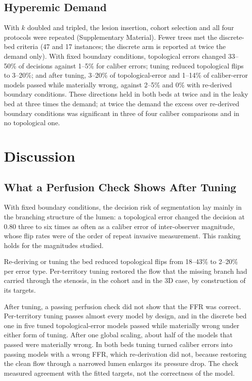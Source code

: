 \documentclass[journal,twoside,web]{ieeecolor}
\begin{document}
\subsection{Hyperemic Demand}\label{sec:demand}
With $k$ doubled and tripled, the lesion insertion, cohort selection and all four protocols were repeated (Supplementary
Material). Fewer trees met the discrete-bed
criteria (47 and 17 instances; the discrete arm is reported at twice the demand only).
With fixed boundary conditions, topological errors changed 33--50\% of decisions against 1--5\% for caliber errors;
tuning reduced topological flips to 3--20\%; and after tuning, 3--20\% of topological-error and 1--14\% of
caliber-error models passed while materially wrong, against 2--5\% and 0\% with re-derived boundary conditions. These
directions held in both beds at twice and in the leaky bed at three times the demand; at twice the demand the
excess over re-derived boundary conditions was significant in three of four caliber comparisons and in no
topological one.

\section{Discussion}
\subsection{What a Perfusion Check Shows After Tuning}
With fixed boundary conditions, the decision risk of segmentation lay mainly in the branching
structure of the lumen: a topological error changed the decision at 0.80 three to six times as often as a caliber
error of inter-observer magnitude, whose flip rates were of the order of repeat invasive measurement. This ranking
holds for the magnitudes studied.

Re-deriving or tuning the bed reduced topological flips from 18--43\% to 2--20\% per error type. Per-territory
tuning restored the flow that the missing branch had carried through the stenosis, in the cohort and in the 3D case, by construction of its targets.

After tuning, a passing perfusion check did not show that the FFR was correct. Per-territory tuning passes
almost every model by design, and in the discrete bed one in five tuned topological-error models passed while
materially wrong under either form of tuning. After one global scaling, about half of the models that passed were materially wrong. In both beds tuning turned
caliber errors into passing models with a wrong FFR, which re-derivation did not, because restoring the clean flow through a narrowed lumen enlarges
its pressure drop. The check measured agreement with the fitted targets, not the correctness of the model.
\end{document}
